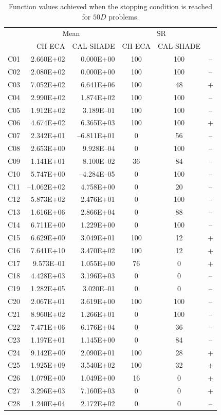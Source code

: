 \documentclass[conference]{IEEEtran}
\begin{document}
% 
% 
% 
\begin{table}[!ht]
	\caption{Function values achieved when the stopping condition is reached for $50D$ problems.}
	\centering
	\begin{tabular}{|c|r|r|c|c|c|}
	 \hline
	 &\multicolumn{2}{|c|}{Mean} & \multicolumn{2}{|c|}{SR} & \\
	\cline{2-5}
	 & CH-ECA & CAL-SHADE & CH-ECA & CAL-SHADE & \\ \hline

  C01 & 2.660E+02  & 0.000E+00  &  100 &  100 & -- \\ 
  C02 & 2.080E+02  & 0.000E+00  &  100 &  100 & -- \\ 
  C03 & 7.052E+02  & 6.641E+06  &  100 &   48 & + \\ 
  C04 & 2.990E+02  & 1.874E+02  &  100 &  100 & -- \\ 
  C05 & 1.912E+02  & 3.189E--01  &  100 &  100 & -- \\ 
  C06 & 4.674E+02  & 6.365E+03  &  100 &  100 & + \\ 
  C07 & 2.342E+01  &--6.811E+01 &    0 &   56 & -- \\ 
  C08 & 2.653E+00  & 9.928E--04  &    0 &  100 & -- \\ 
  C09 & 1.141E+01  & 8.100E--02  &   36 &   84 & -- \\ 
  C10 & 5.747E+00  &--4.284E--05 &    0 &  100 & -- \\ 
  C11 &--1.062E+02 & 4.758E+00  &    0 &   20 & -- \\ 
  C12 & 5.873E+02  & 2.476E+01  &    0 &  100 & -- \\ 
  C13 & 1.616E+06  & 2.866E+04  &    0 &   88 & -- \\ 
  C14 & 6.711E+00  & 1.229E+00  &    0 &  100 & -- \\ 
  C15 & 6.629E+00  & 3.049E+01  &  100 &   12 & + \\ 
  C16 & 7.641E+10  & 3.470E+02  &  100 &   12 & + \\ 
  C17 & 9.573E--01  & 1.055E+00  &   76 &    0 & + \\ 
  C18 & 4.428E+03  & 3.196E+03  &    0 &    0 & -- \\ 
  C19 & 1.282E+05  & 3.020E--01  &    0 &    0 & -- \\ 
  C20 & 2.067E+01  & 3.619E+00  &  100 &  100 & -- \\ 
  C21 & 8.960E+02  & 1.266E+01  &    0 &  100 & -- \\ 
  C22 & 7.471E+06  & 6.176E+04  &    0 &   36 & -- \\ 
  C23 & 1.197E+01  & 1.145E+00  &    0 &   84 & -- \\ 
  C24 & 9.142E+00  & 2.090E+01  &  100 &   28 & + \\ 
  C25 & 1.925E+09  & 3.540E+02  &  100 &   32 & + \\ 
  C26 & 1.079E+00  & 1.049E+00  &   16 &    0 & + \\ 
  C27 & 3.296E+03  & 7.160E+03  &    0 &    0 & + \\ 
  C28 & 1.240E+04  & 2.172E+02  &    0 &    0 & -- \\ 
   \hline
	\end{tabular}
	\label{tab:d50c}
\end{table}
\end{document}
